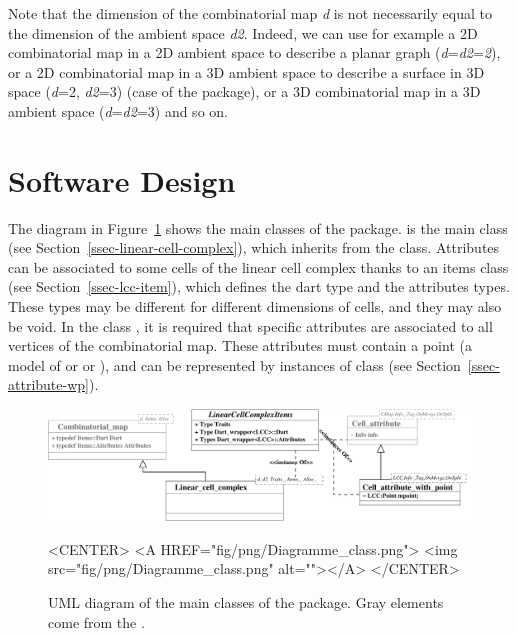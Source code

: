 Note that the dimension of the combinatorial map \emph{d} is not
necessarily equal to the dimension of the ambient space
\emph{d2}. Indeed, we can use for example a 2D combinatorial map in a
2D ambient space to describe a planar graph
(\emph{d}=\emph{d2}=\emph{2}), or a 2D combinatorial map in a 3D
ambient space to describe a surface in 3D space (\emph{d}=2,
\emph{d2}=3) (case of the  package), or a 3D
combinatorial map in a 3D ambient space (\emph{d}=\emph{d2}=3) and so
on.

\section{Software Design}

The diagram in Figure~\ref{fig-diagram_class_lcc} shows the main
classes of the package.   is the main
class (see Section~\ref{ssec-linear-cell-complex}), which inherits from
the  class.  Attributes can be associated
to some cells of the linear cell complex thanks to an items class (see
Section~\ref{ssec-lcc-item}), which defines the dart type and the
attributes types. These types may be different for different
dimensions of cells, and they may also be void.  In the class
, it is required that
specific attributes are associated to all vertices of the
combinatorial map. These attributes must contain a point (a model of
 or  or ),
and can be represented by instances of class
 (see
Section~\ref{ssec-attribute-wp}).
%
\begin{figure}
  \begin{ccTexOnly}
    \begin{center}
      \includegraphics[width=.95\textwidth]
      {Linear_cell_complex/fig/pdf/Diagramme_class}
    \end{center}
  \end{ccTexOnly}
  \begin{ccHtmlOnly}
    <CENTER>
    <A HREF="fig/png/Diagramme_class.png">
        <img src="fig/png/Diagramme_class.png" alt=""></A>
    </CENTER>
    \end{ccHtmlOnly}
    \caption{UML diagram of the main classes of the package. Gray
      elements come from the 
      .}
    \label{fig-diagram_class_lcc}
\end{figure}

